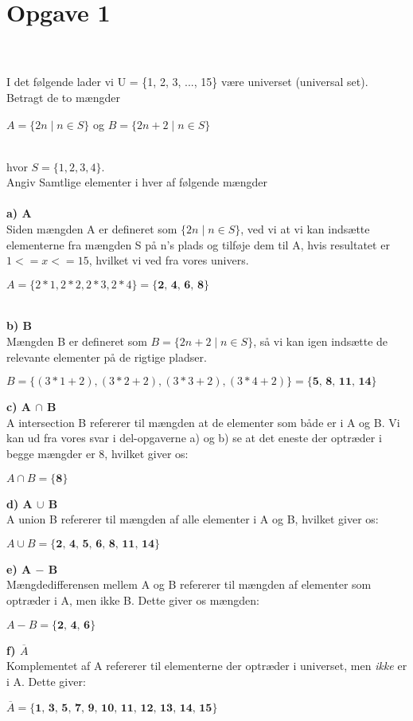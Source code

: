 \section{Opgave 1}

\\
\\
I det følgende lader vi U = \{1, 2, 3, ..., 15\} være universet (universal set).
\\
Betragt de to mængder
\begin{center}
    \( A = \{ 2n \mid n \in S \} \) og \( B = \{ 2n + 2 \mid n \in S \} \)
\end{center}
\\
hvor \(S = \{1, 2, 3, 4\}.\)
\\
Angiv Samtlige elementer i hver af følgende mængder
\\
\\
\textbf{a) A}\\
Siden mængden A er defineret som \(\{ 2n \mid n \in S \}\), ved vi at vi kan indsætte elementerne fra mængden S på n's plads og tilføje dem til A, hvis resultatet er \(1 <= x <= 15\), hvilket vi ved fra vores univers.
\begin{center}
\(A = \{2*1, 2*2, 2*3, 2*4\} = \textbf{\{2, 4, 6, 8\}}\) \\
\end{center}
\\
\textbf{b) B}\\
Mængden B er defineret som \(B = \{2n + 2 \mid n \in S\}\), så vi kan igen indsætte de relevante elementer på de rigtige pladser. 
\begin{center}
    \(B = \{(3*1+2), (3*2+2), (3*3+2), (3*4+2)\} = \textbf{\{5, 8, 11, 14\}}\)
\end{center}
\textbf{c) A \(\cap\) B}\\
A intersection B refererer til mængden at de elementer som både er i A og B. Vi kan ud fra vores svar i del-opgaverne a) og b) se at det eneste der optræder i begge mængder er 8, hvilket giver os: 
\begin{center}
    \(A \cap B = \textbf{\{8\}}\) \\
\end{center}
\textbf{d) A \(\cup\) B}\\
A union B refererer til mængden af alle elementer i A og B, hvilket giver os: 
\begin{center}
    \(A \cup B = \textbf{\{2, 4, 5, 6, 8, 11, 14\}}\)
\end{center}
\textbf{e) A \( - \) B}\\
Mængdedifferensen mellem A og B refererer til mængden af elementer som optræder i A, men ikke B. Dette giver os mængden:
\begin{center}
    \(A - B = \textbf{\{2, 4, 6\}}\)
\end{center}
\textbf{f) \(\overline{A}\)} \\
Komplementet af A refererer til elementerne der optræder i universet, men \textit{ikke} er i A. Dette giver:
\begin{center}
    \(\overline{A} = \textbf{\{1, 3, 5, 7, 9, 10, 11, 12, 13, 14, 15\}}\)
\end{center}
\\
\\